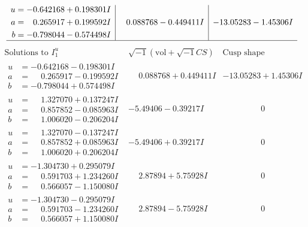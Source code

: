 \documentclass[1p]{elsarticle_modified}
\theoremstyle{definition}
\newcommand{\I}{\sqrt{-1}}
\begin{document}
$$\begin{array}{c|c|c}
\begin{aligned}
u &= -0.642168 + 0.198301 I \\
a &= \phantom{-}0.265917 + 0.199592 I \\
b &= -0.798044 - 0.574498 I\end{aligned}
 & \phantom{-}0.088768 - 0.449411 I & -13.05283 - 1.45306 I\\
 \hline 
 \end{array}$$\newpage$$\begin{array}{c|c|c}  
\text{Solutions to }I^u_{1}& \I (\text{vol} + \sqrt{-1}CS) & \text{Cusp shape}\\
 \hline 
\begin{aligned}
u &= -0.642168 - 0.198301 I \\
a &= \phantom{-}0.265917 - 0.199592 I \\
b &= -0.798044 + 0.574498 I\end{aligned}
 & \phantom{-}0.088768 + 0.449411 I & -13.05283 + 1.45306 I \\ \hline\begin{aligned}
u &= \phantom{-}1.327070 + 0.137247 I \\
a &= \phantom{-}0.857852 - 0.085963 I \\
b &= \phantom{-}1.006020 - 0.206204 I\end{aligned}
 & -5.49406 - 0.39217 I & \phantom{-0.000000 } 0 \\ \hline\begin{aligned}
u &= \phantom{-}1.327070 - 0.137247 I \\
a &= \phantom{-}0.857852 + 0.085963 I \\
b &= \phantom{-}1.006020 + 0.206204 I\end{aligned}
 & -5.49406 + 0.39217 I & \phantom{-0.000000 } 0 \\ \hline\begin{aligned}
u &= -1.304730 + 0.295079 I \\
a &= \phantom{-}0.591703 + 1.234260 I \\
b &= \phantom{-}0.566057 - 1.150080 I\end{aligned}
 & \phantom{-}2.87894 + 5.75928 I & \phantom{-0.000000 } 0 \\ \hline\begin{aligned}
u &= -1.304730 - 0.295079 I \\
a &= \phantom{-}0.591703 - 1.234260 I \\
b &= \phantom{-}0.566057 + 1.150080 I\end{aligned}
 & \phantom{-}2.87894 - 5.75928 I & \phantom{-0.000000 } 0 \\ \hline\begin{aligned}

\end{aligned}
\end{array}$$
\end{document}
